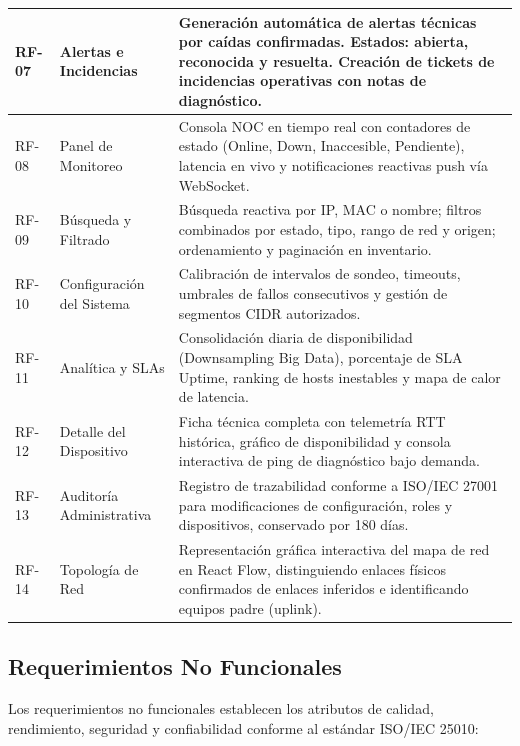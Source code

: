 \documentclass[12pt,a4paper]{report}
\begin{document}
\begin{table}[H]
\begin{tabularx}{\textwidth}{p{1.4cm} p{3.2cm} X}
\midrule
RF-07 & Alertas e Incidencias & Generación automática de alertas técnicas por caídas confirmadas. Estados: abierta, reconocida y resuelta. Creación de tickets de incidencias operativas con notas de diagnóstico. \\
\midrule
RF-08 & Panel de Monitoreo & Consola NOC en tiempo real con contadores de estado (Online, Down, Inaccesible, Pendiente), latencia en vivo y notificaciones reactivas push vía WebSocket. \\
\midrule
RF-09 & Búsqueda y Filtrado & Búsqueda reactiva por IP, MAC o nombre; filtros combinados por estado, tipo, rango de red y origen; ordenamiento y paginación en inventario. \\
\midrule
RF-10 & Configuración del Sistema & Calibración de intervalos de sondeo, timeouts, umbrales de fallos consecutivos y gestión de segmentos CIDR autorizados. \\
\midrule
RF-11 & Analítica y SLAs & Consolidación diaria de disponibilidad (Downsampling Big Data), porcentaje de SLA Uptime, ranking de hosts inestables y mapa de calor de latencia. \\
\midrule
RF-12 & Detalle del Dispositivo & Ficha técnica completa con telemetría RTT histórica, gráfico de disponibilidad y consola interactiva de ping de diagnóstico bajo demanda. \\
\midrule
RF-13 & Auditoría Administrativa & Registro de trazabilidad conforme a ISO/IEC 27001 para modificaciones de configuración, roles y dispositivos, conservado por 180 días. \\
\midrule
RF-14 & Topología de Red & Representación gráfica interactiva del mapa de red en React Flow, distinguiendo enlaces físicos confirmados de enlaces inferidos e identificando equipos padre (uplink). \\
\bottomrule
\end{tabularx}
\end{table}

\subsection{Requerimientos No Funcionales}

Los requerimientos no funcionales establecen los atributos de calidad, rendimiento, seguridad y confiabilidad conforme al estándar ISO/IEC 25010:
\end{document}
